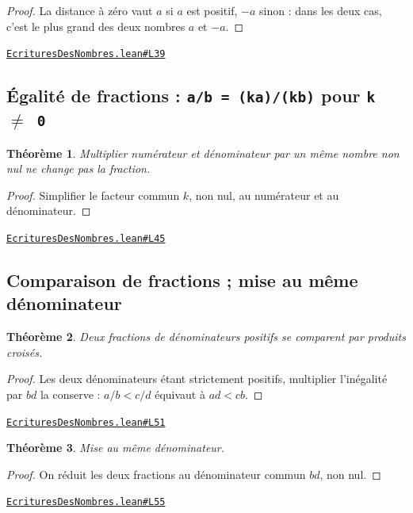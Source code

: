 \documentclass[11pt,a4paper]{article}
\theoremstyle{definition}
\theoremstyle{plain}
\newtheorem{theoreme}{Théorème}
\newcommand{\source}[2]{\par\smallskip\noindent\hfill{\footnotesize\href{#1}{\texttt{#2}}}\par\smallskip}
\begin{document}
\begin{proof}
La distance à zéro vaut $a$ si $a$ est positif, $-a$ sinon : dans les deux cas,
c'est le plus grand des deux nombres $a$ et $-a$.
\end{proof}
\source{https://github.com/Commutator-IO/learn-lean/blob/main/courses/01-college/01-nombres-et-calculs/EcrituresDesNombres.lean\#L39}{EcrituresDesNombres.lean\#L39}

\subsection{Égalité de fractions : \texttt{a/b = (ka)/(kb)} pour \texttt{k \(\ne\) 0}}

\begin{theoreme}
Multiplier numérateur et dénominateur par un même nombre non nul ne change pas la
fraction.
\end{theoreme}

\begin{proof}
Simplifier le facteur commun $k$, non nul, au numérateur et au dénominateur.
\end{proof}
\source{https://github.com/Commutator-IO/learn-lean/blob/main/courses/01-college/01-nombres-et-calculs/EcrituresDesNombres.lean\#L45}{EcrituresDesNombres.lean\#L45}

\subsection{Comparaison de fractions ; mise au même dénominateur}

\begin{theoreme}
Deux fractions de dénominateurs positifs se comparent par produits croisés.
\end{theoreme}

\begin{proof}
Les deux dénominateurs étant strictement positifs, multiplier l'inégalité par $bd$
la conserve : $a/b < c/d$ équivaut à $ad < cb$.
\end{proof}
\source{https://github.com/Commutator-IO/learn-lean/blob/main/courses/01-college/01-nombres-et-calculs/EcrituresDesNombres.lean\#L51}{EcrituresDesNombres.lean\#L51}

\begin{theoreme}
Mise au même dénominateur.
\end{theoreme}

\begin{proof}
On réduit les deux fractions au dénominateur commun $bd$, non nul.
\end{proof}
\source{https://github.com/Commutator-IO/learn-lean/blob/main/courses/01-college/01-nombres-et-calculs/EcrituresDesNombres.lean\#L55}{EcrituresDesNombres.lean\#L55}
\end{document}
